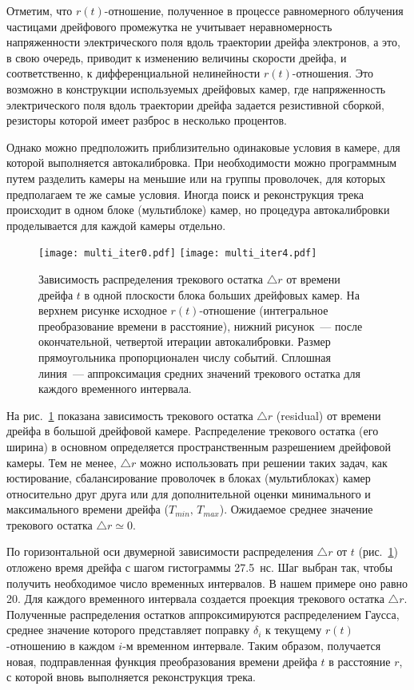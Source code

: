 Отметим, что $r(t)$-отношение, полученное в процессе равномерного облучения
частицами дрейфового промежутка не учитывает неравномерность напряженности
электрического поля вдоль траектории дрейфа электронов, а это, в свою очередь,
приводит к изменению величины скорости дрейфа, и соответственно, к
дифференциальной нелинейности $r(t)$-отношения. Это возможно в конструкции
используемых дрейфовых камер, где напряженность электрического поля вдоль
траектории дрейфа задается резистивной сборкой, резисторы которой имеет разброс
в несколько процентов.

Однако можно предположить приблизительно одинаковые условия в камере, для
которой выполняется автокалибровка. При необходимости можно программным путем
разделить камеры на меньшие или на группы проволочек, для которых предполагаем
те же самые условия. Иногда поиск и реконструкция трека происходит в одном
блоке (мультиблоке) камер, но процедура автокалибровки проделывается для
каждой камеры отдельно.

\begin{figure}[h]
  \centering
  \texttt{[image: multi\_iter0.pdf]}
  \texttt{[image: multi\_iter4.pdf]}
  \caption{Зависимость распределения трекового остатка $\triangle r$ от времени
    дрейфа $t$ в одной плоскости блока больших дрейфовых камер. На верхнем
    рисунке исходное $r(t)$-отношение (интегральное преобразование времени
    в расстояние), нижний рисунок~--- после окончательной, четвертой итерации
    автокалибровки. Размер прямоугольника пропорционален числу событий. Сплошная
    линия~--- аппроксимация средних значений трекового остатка для каждого
    временного интервала.}
  \label{fig:multi_iter}
\end{figure}

На рис.~\ref{fig:multi_iter} показана зависимость трекового остатка
$\triangle r$ (residual) от времени дрейфа в большой дрейфовой камере.
Распределение трекового остатка (его ширина) в основном определяется
пространственным разрешением дрейфовой камеры. Тем не менее, $\triangle r$
можно использовать при решении таких задач, как юстирование, сбалансирование
проволочек в блоках (мультиблоках) камер относительно друг друга или для
дополнительной оценки минимального и максимального времени дрейфа
($T_{min},\,T_{max}$). Ожидаемое среднее значение трекового остатка
$\triangle r \simeq 0$.

По горизонтальной оси двумерной зависимости распределения $\triangle r$ от $t$
(рис.~\ref{fig:multi_iter}) отложено время дрейфа с шагом гистограммы 27.5~нс.
Шаг выбран так, чтобы получить необходимое число временных интервалов. В нашем
примере оно равно 20. Для каждого временного интервала создается проекция
трекового остатка $\triangle r$. Полученные распределения остатков
аппроксимируются распределением Гаусса, среднее значение которого представляет
поправку $\delta_i$ к текущему $r(t)$-отношению в каждом $i$-м временном
интервале. Таким образом, получается новая, подправленная функция преобразования
времени дрейфа $t$ в расстояние $r$, с которой вновь выполняется реконструкция
трека.

